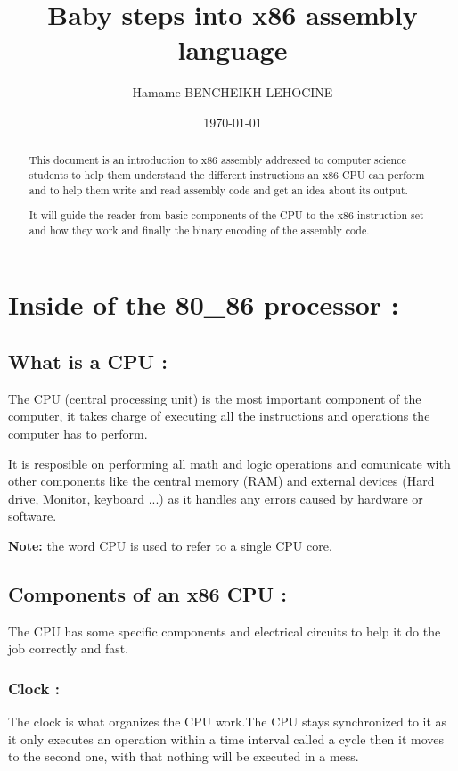 \documentclass[10pt]{article}
\title{\centering\textbf{Baby steps into x86 assembly language}}
\author{Hamame BENCHEIKH LEHOCINE}
\date{\today}
\begin{document}
    
    \maketitle
    \newpage
    \begin{abstract}
        \centering
        This document is an introduction to x86 assembly addressed to computer science students 
        to help them understand the different instructions an x86 CPU can perform and to help them 
        write and read assembly code and get an idea about its output.


        It will guide the reader from basic components of the CPU to the x86 instruction set
        and how they work and finally the binary encoding of the assembly code.
    \end{abstract}
    \newpage
    \section{Inside of the 80\_86 processor : }
    \subsection{What is a CPU : }
    \tabto{20pt}The CPU (central processing unit) is the most important component of the computer,
     it takes charge of executing all the instructions and operations the computer has to perform.

    It is resposible on performing all math and logic operations 
    and comunicate with other components like the central memory 
    (RAM) and external devices (Hard drive, Monitor, keyboard ...) 
    as it handles any errors caused by hardware or software.
    
    \textbf{Note: }the word CPU is used to refer to a single CPU core.

    \subsection{Components of an x86 CPU : }
    \tabto{20pt}The CPU has some specific components and electrical circuits to help it do the job correctly and fast.
    \subsubsection{Clock : }
    \tabto{20pt}The clock is what organizes the CPU work.The CPU stays synchronized to it as it only executes an
     operation within a time interval called a cycle then it moves to the second one, with that nothing will be executed in a mess.
    
\end{document}
